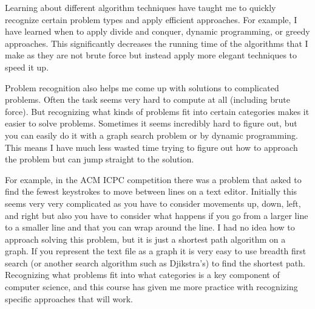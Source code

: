 \documentclass{article}
\begin{document}
Learning about different algorithm techniques have taught me to quickly recognize certain problem types and apply efficient approaches.
For example, I have learned when to apply divide and conquer, dynamic programming,
or greedy approaches. This significantly decreases the running time of the algorithms that I make as they are not brute force but instead apply more elegant techniques to speed it up.

Problem recognition also helps me come up with solutions to complicated problems.
Often the task seems very hard to compute at all (including brute force). But recognizing what kinds of problems fit into certain categories makes it easier to solve problems.
Sometimes it seems incredibly hard to figure out, but you can easily do it with a graph search problem or by dynamic programming.
This means I have much less wasted time trying to figure out how to approach the problem but can jump straight to the solution.

For example, in the ACM ICPC competition there was a problem that asked to find the fewest keystrokes to move between lines on a text editor.
Initially this seems very very complicated as you have to consider movements up,
down, left, and right but also you have to consider what happens if you go from a larger line to a smaller line and that you can wrap around the line.
I had no idea how to approach solving this problem, but it is just a shortest path algorithm on a graph.
If you represent the text file as a graph it is very easy to use breadth first search (or another search algorithm such as Djikstra's) to find the shortest path.
Recognizing what problems fit into what categories is a key component of computer science,
 and this course has given me more practice with recognizing specific approaches that will work.
 
\end{document}
